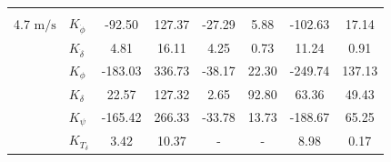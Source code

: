 \begin{table}[]
\begin{tabular}{llcccccc}
                                 &                       & \multicolumn{1}{l}{}                       & \multicolumn{1}{l}{}                               & \multicolumn{1}{l}{}                       & \multicolumn{1}{l}{}                               & \multicolumn{1}{l}{}                       & \multicolumn{1}{l}{}                               \\ \cline{3-8} 
    4.7 $\si{\meter\per\second}$ & $K_{\dot{\phi}} $     & -92.50                                     & 127.37                                             & -27.29                                     & 5.88                                               & -102.63                                    & 17.14                                              \\
                                 & $K_{\dot{\delta}}$    & 4.81                                       & 16.11                                              & 4.25                                       & 0.73                                               & 11.24                                      & 0.91                                               \\
                                 & $K_{\phi} $           & -183.03                                    & 336.73                                             & -38.17                                     & 22.30                                              & -249.74                                    & 137.13                                             \\
                                 & $K_\delta $           & 22.57                                      & 127.32                                             & 2.65                                       & 92.80                                              & 63.36                                      & 49.43                                              \\
                                 & $K_\psi $             & -165.42                                    & 266.33                                             & -33.78                                     & 13.73                                              & -188.67                                    & 65.25                                              \\
                                 & $K_{T_\delta}$        & 3.42                                       & 10.37                                              & -                                          & -                                                  & 8.98                                       & 0.17                                               \\ \cline{2-8} 

\end{tabular}
\end{table}
